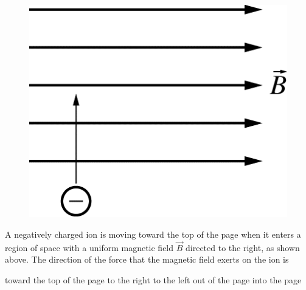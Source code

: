 \begin{figure}[H]
\centering
\includegraphics[scale=0.3]{images/img-015-023.png}
\end{figure}

\begin{questions}\setcounter{question}{33}\question
A negatively charged ion is moving toward the top of the page when it enters a region of space with a uniform magnetic field $\vec{B}$ directed to the right, as shown above. The direction of the force that the magnetic field exerts on the ion is

\begin{choices}
\choice toward the top of the page
\choice to the right
\choice to the left
\choice out of the page
\choice into the page
\end{choices}\end{questions}
